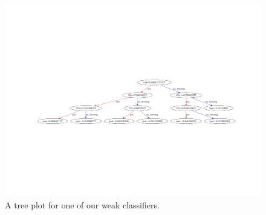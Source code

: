 \documentclass{article}
\begin{document}
\begin{figure}
	\centering
	\includegraphics[scale=0.8]{xgb_final_tree_plot}
	\caption{A tree plot for one of our weak classifiers.}
	\label{xgbtreeplot}
\end{figure}
\end{document}
